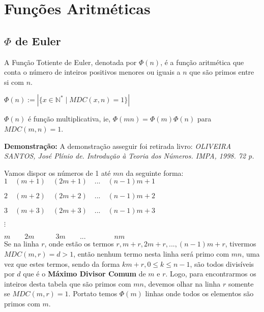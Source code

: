 
\chapter{Funções Aritméticas} %

\label{Chapter3} %


\section{$\Phi$ de Euler}

\begin{definition}
A Função Totiente de Euler, denotada por $\Phi(n)$, é a função aritmética que conta o número 
de inteiros positivos menores ou iguais a $n$ que são primos entre si com $n$.

$\Phi(n) := |\{ x \in \mathbb{N}^{*} \mid MDC(x,n) = 1 \}|$
\end{definition}



\begin{theorem}\label{phi_multiplicativa}
$\Phi(n)$ é função multiplicativa, ie, $\Phi(mn) = \Phi(m)\Phi(n)$ para $MDC(m,n) = 1$.
\end{theorem}
\textbf{Demonstração:}
A demonstração asseguir foi retirada livro: \textit{OLIVEIRA SANTOS, José Plínio de. Introdução à Teoria dos Números. IMPA, 1998. 72 p.}

Vamos dispor os números de 1 até $mn$ da seguinte forma:\\

$1\quad(m+1)\quad(2m+1)\quad...\quad(n-1)m+1$

$2\quad(m+2)\quad(2m+2)\quad...\quad(n-1)m+2$

$3\quad(m+3)\quad(2m+3)\quad...\quad(n-1)m+3$

$\vdots$

$m\quad\quad2m\quad\quad\quad3m\quad\quad...\quad\quad\quad\quad{nm}$\\

Se na linha $r$, onde estão os termos $r,m+r,2m+r,...,(n-1)m+r$, tivermos $MDC(m,r) = d > 1$, então nenhum termo nesta linha será primo com $mn$, uma vez que estes termos, sendo da forma $km+r, 0 \leq k \leq n-1$, são todos divisíveis por $d$ que é o 
\textbf{Máximo Divisor Comum} de $m$ e $r$. Logo, para encontrarmos os inteiros desta tabela que são primos com $mn$, devemos olhar na linha $r$ somente se $MDC(m,r)=1$.
Portato temos $\Phi(m)$ linhas onde todos os elementos são primos com $m$.

